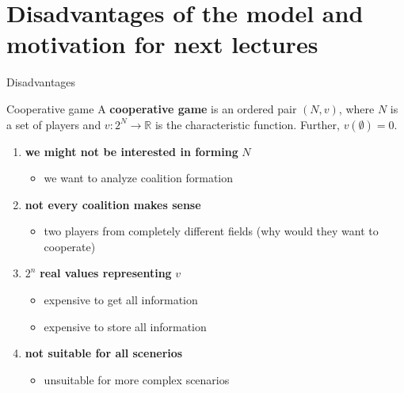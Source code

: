 \documentclass{beamer}
\begin{document}

\section{Disadvantages of the model and motivation for next lectures}


\begin{frame}{Disadvantages}
    \begin{block}{Cooperative game}
        A \textbf{cooperative game} is an ordered pair $(N,v)$, where $N$ is a set of players and $v\colon 2^N \to \mathbb{R}$ is the characteristic function. Further, $v(\emptyset) = 0$.
    \end{block}
	\begin{enumerate}
		\item \textbf{we might not be interested in forming} $N$
		\begin{itemize}
			\item we want to analyze coalition formation
		\end{itemize}
		\item \textbf{not every coalition makes sense}
		\begin{itemize}
			\item two players from completely different fields (why would they want to cooperate)
		\end{itemize}
		\item $2^n$ \textbf{real values representing} $v$
		\begin{itemize}
			\item expensive to get all information
			\item expensive to store all information
		\end{itemize}
		\item \textbf{not suitable for all scenerios}
		\begin{itemize}
			\item unsuitable for more complex scenarios
		\end{itemize}
	\end{enumerate}
\end{frame}


\end{document}
